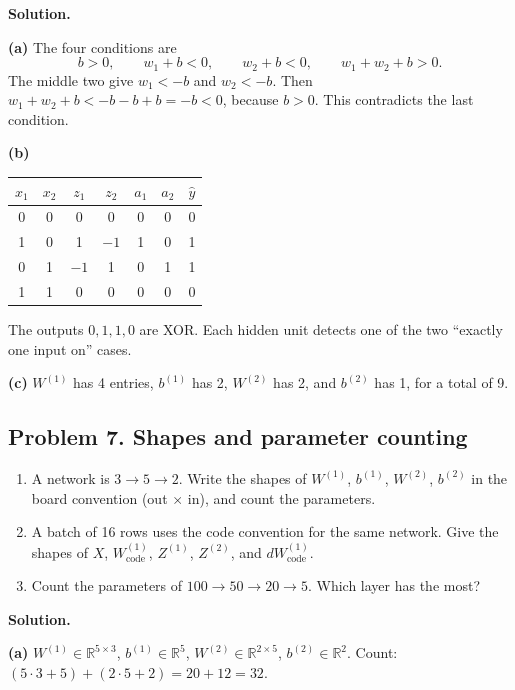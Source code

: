 \textbf{Solution.}

\textbf{(a)} The four conditions are
\[
b > 0,\qquad w_1 + b < 0,\qquad w_2 + b < 0,\qquad w_1 + w_2 + b > 0.
\]
The middle two give $w_1 < -b$ and $w_2 < -b$. Then $w_1 + w_2 + b < -b - b + b = -b < 0$, because $b > 0$. This contradicts the last condition.

\textbf{(b)}
\begin{center}
\begin{tabular}{@{}ccccccc@{}}
\toprule
$x_1$ & $x_2$ & $z_1$ & $z_2$ & $a_1$ & $a_2$ & $\hat y$ \\
\midrule
0 & 0 & 0 & 0 & 0 & 0 & 0 \\
1 & 0 & 1 & $-1$ & 1 & 0 & 1 \\
0 & 1 & $-1$ & 1 & 0 & 1 & 1 \\
1 & 1 & 0 & 0 & 0 & 0 & 0 \\
\bottomrule
\end{tabular}
\end{center}
The outputs $0,1,1,0$ are XOR. Each hidden unit detects one of the two ``exactly one input on'' cases.

\textbf{(c)} $W^{(1)}$ has 4 entries, $b^{(1)}$ has 2, $W^{(2)}$ has 2, and $b^{(2)}$ has 1, for a total of 9.

\subsection*{Problem 7. Shapes and parameter counting}

\begin{enumerate}[label=(\alph*)]
\item A network is $3\to5\to2$. Write the shapes of $W^{(1)}$, $b^{(1)}$, $W^{(2)}$, $b^{(2)}$ in the board convention (out $\times$ in), and count the parameters.
\item A batch of 16 rows uses the code convention for the same network. Give the shapes of $X$, $W^{(1)}_{\text{code}}$, $Z^{(1)}$, $Z^{(2)}$, and $dW^{(1)}_{\text{code}}$.
\item Count the parameters of $100\to50\to20\to5$. Which layer has the most?
\end{enumerate}

\textbf{Solution.}

\textbf{(a)} $W^{(1)}\in\mathbb{R}^{5\times3}$, $b^{(1)}\in\mathbb{R}^5$, $W^{(2)}\in\mathbb{R}^{2\times5}$, $b^{(2)}\in\mathbb{R}^2$. Count: $(5\cdot 3 + 5) + (2\cdot 5 + 2) = 20 + 12 = 32$.

